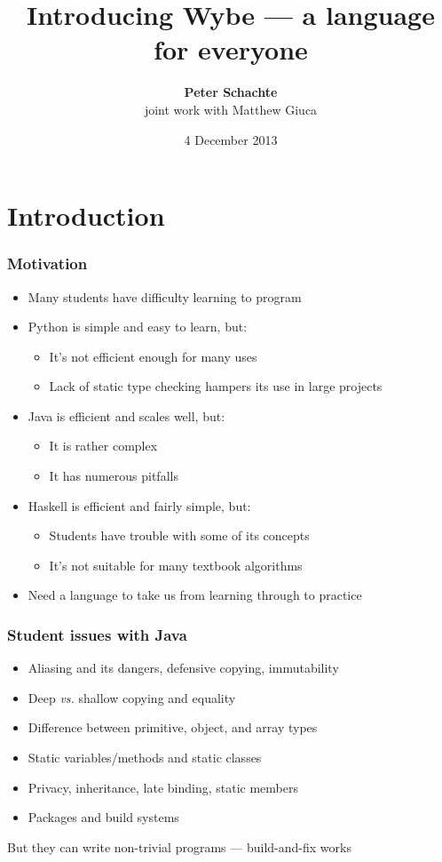 \documentclass[12pt]{beamer}
\title[Introducing Wybe]{Introducing Wybe --- a language for everyone}
\author[Peter Schachte]
{\textbf{Peter Schachte}  \\
  \small joint work with Matthew Giuca}
\institute[Melbourne]{The University of Melbourne \\ Department of
  Computing and Information Systems}
\date{4 December 2013}
\begin{document}
\frame{\titlepage}

\section{Introduction}

\begin{frame}
\frametitle{Motivation}
\begin{itemize}
\item Many students have difficulty learning to program
\item Python is simple and easy to learn, but:
  \begin{itemize}
  \item It's not efficient enough for many uses
  \item Lack of static type checking hampers its use in large projects
  \end{itemize}
\item Java is efficient and scales well, but:
  \begin{itemize}
  \item It is rather complex
  \item It has numerous pitfalls
  \end{itemize}
\item Haskell is efficient and fairly simple, but:
  \begin{itemize}
  \item Students have trouble with some of its concepts
  \item It's not suitable for many textbook algorithms
  \end{itemize}
\item Need a language to take us from learning through to practice
\end{itemize}
\end{frame}

\begin{frame}
\frametitle{Student issues with Java}
\begin{itemize}
\item Aliasing and its dangers, defensive copying, immutability
\item Deep \emph{vs.} shallow copying and equality
\item Difference between primitive, object, and array types
\item Static variables/methods and static classes
\item Privacy, inheritance, late binding, static members
\item Packages and build systems
\end{itemize}

But they can write non-trivial programs --- build-and-fix works

\end{frame}
\end{document}
